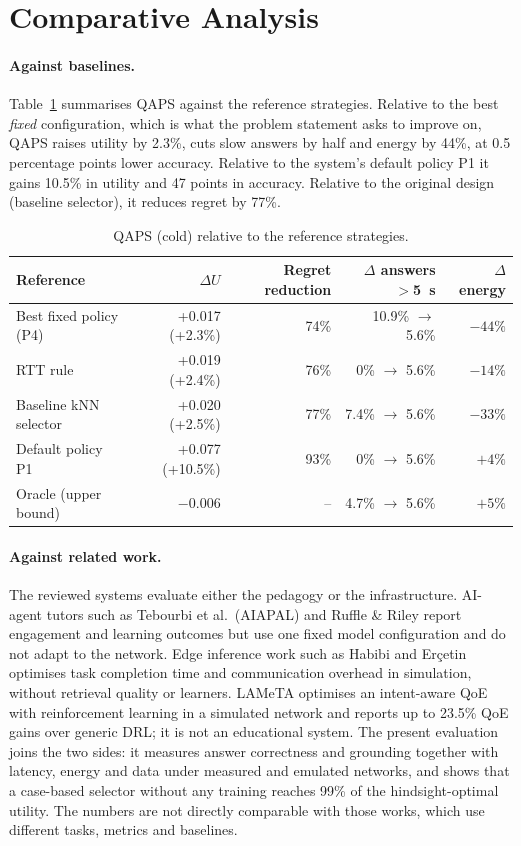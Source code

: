 \section{Comparative Analysis}
\label{sec:comparative}

\paragraph{Against baselines.} Table~\ref{tab:compare} summarises QAPS against the reference
strategies. Relative to the best \emph{fixed} configuration, which is what the problem statement asks to
improve on, QAPS raises utility by 2.3\%, cuts slow answers by half and energy by 44\%, at 0.5 percentage
points lower accuracy. Relative to the system's default policy P1 it gains 10.5\% in utility and 47
points in accuracy. Relative to the original design (baseline selector), it reduces regret by 77\%.

\begin{table}[htbp]
  \centering
  \caption{QAPS (cold) relative to the reference strategies.}
  \label{tab:compare}
  \begin{tabular}{lrrrr}
    \toprule
    Reference & $\Delta U$ & Regret reduction & $\Delta$ answers $>$5~s & $\Delta$ energy \\
    \midrule
    Best fixed policy (P4) & +0.017 (+2.3\%) & 74\% & 10.9\% $\rightarrow$ 5.6\% & $-44\%$ \\
    RTT rule & +0.019 (+2.4\%) & 76\% & 0\% $\rightarrow$ 5.6\% & $-14\%$ \\
    Baseline kNN selector & +0.020 (+2.5\%) & 77\% & 7.4\% $\rightarrow$ 5.6\% & $-33\%$ \\
    Default policy P1 & +0.077 (+10.5\%) & 93\% & 0\% $\rightarrow$ 5.6\% & $+4\%$ \\
    Oracle (upper bound) & $-0.006$ & -- & 4.7\% $\rightarrow$ 5.6\% & $+5\%$ \\
    \bottomrule
  \end{tabular}
\end{table}

\paragraph{Against related work.} The reviewed systems evaluate either the pedagogy or the
infrastructure. AI-agent tutors such as Tebourbi et al.\ (AIAPAL) and Ruffle \& Riley report engagement
and learning outcomes but use one fixed model configuration and do not adapt to the network. Edge
inference work such as Habibi and Er\c{c}etin optimises task completion time and communication overhead
in simulation, without retrieval quality or learners. LAMeTA optimises an intent-aware QoE with
reinforcement learning in a simulated network and reports up to 23.5\% QoE gains over generic DRL; it is
not an educational system. The present evaluation joins the two sides: it measures answer correctness and
grounding together with latency, energy and data under measured and emulated networks, and shows that a
case-based selector without any training reaches 99\% of the hindsight-optimal utility. The numbers are
not directly comparable with those works, which use different tasks, metrics and baselines.

